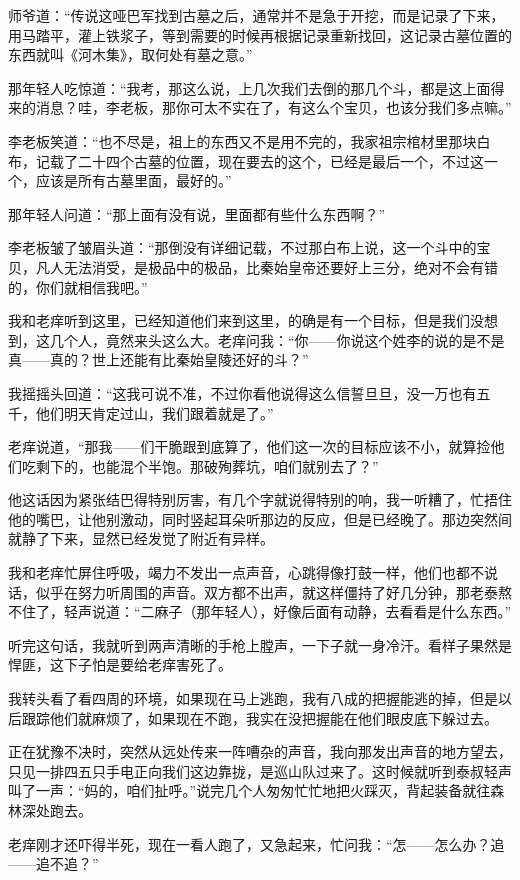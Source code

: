师爷道：“传说这哑巴军找到古墓之后，通常并不是急于开挖，而是记录了下来，用马踏平，灌上铁浆子，等到需要的时候再根据记录重新找回，这记录古墓位置的东西就叫《河木集》，取何处有墓之意。”

那年轻人吃惊道：“我考，那这么说，上几次我们去倒的那几个斗，都是这上面得来的消息？哇，李老板，那你可太不实在了，有这么个宝贝，也该分我们多点嘛。”

李老板笑道：“也不尽是，祖上的东西又不是用不完的，我家祖宗棺材里那块白布，记载了二十四个古墓的位置，现在要去的这个，已经是最后一个，不过这一个，应该是所有古墓里面，最好的。”

那年轻人问道：“那上面有没有说，里面都有些什么东西啊？”

李老板皱了皱眉头道：“那倒没有详细记载，不过那白布上说，这一个斗中的宝贝，凡人无法消受，是极品中的极品，比秦始皇帝还要好上三分，绝对不会有错的，你们就相信我吧。”

我和老痒听到这里，已经知道他们来到这里，的确是有一个目标，但是我们没想到，这几个人，竟然来头这么大。老痒问我：“你——你说这个姓李的说的是不是真——真的？世上还能有比秦始皇陵还好的斗？”

我摇摇头回道：“这我可说不准，不过你看他说得这么信誓旦旦，没一万也有五千，他们明天肯定过山，我们跟着就是了。”

老痒说道，“那我——们干脆跟到底算了，他们这一次的目标应该不小，就算捡他们吃剩下的，也能混个半饱。那破殉葬坑，咱们就别去了？”

他这话因为紧张结巴得特别厉害，有几个字就说得特别的响，我一听糟了，忙捂住他的嘴巴，让他别激动，同时竖起耳朵听那边的反应，但是已经晚了。那边突然间就静了下来，显然已经发觉了附近有异样。

我和老痒忙屏住呼吸，竭力不发出一点声音，心跳得像打鼓一样，他们也都不说话，似乎在努力听周围的声音。双方都不出声，就这样僵持了好几分钟，那老泰熬不住了，轻声说道：“二麻子（那年轻人），好像后面有动静，去看看是什么东西。”

听完这句话，我就听到两声清晰的手枪上膛声，一下子就一身冷汗。看样子果然是悍匪，这下子怕是要给老痒害死了。

我转头看了看四周的环境，如果现在马上逃跑，我有八成的把握能逃的掉，但是以后跟踪他们就麻烦了，如果现在不跑，我实在没把握能在他们眼皮底下躲过去。

正在犹豫不决时，突然从远处传来一阵嘈杂的声音，我向那发出声音的地方望去，只见一排四五只手电正向我们这边靠拢，是巡山队过来了。这时候就听到泰叔轻声叫了一声：“妈的，咱们扯呼。”说完几个人匆匆忙忙地把火踩灭，背起装备就往森林深处跑去。

老痒刚才还吓得半死，现在一看人跑了，又急起来，忙问我：“怎——怎么办？追——追不追？”

